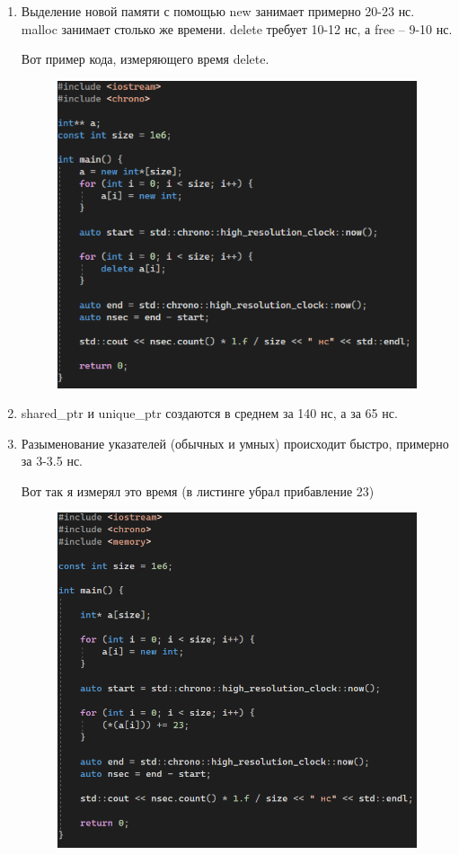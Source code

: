 \documentclass[a4paper,12pt]{article}
\begin{document}
\begin{enumerate}
\item Выделение новой памяти с помощью new занимает примерно 20-23 нс. malloc занимает столько же времени. delete требует 10-12 нс, а free -- 9-10 нс.

Вот пример кода, измеряющего время delete.

\begin{figure}[H]
  \centering
  \includegraphics[width=1\linewidth]{images/asm7_5.png}
\end{figure}

\item shared\_ptr и unique\_ptr создаются в среднем за 140 нс, а  за 65 нс.

\item Разыменование указателей (обычных и умных) происходит быстро, примерно за 3-3.5 нс.

Вот так я измерял это время (в листинге убрал прибавление 23)

\begin{figure}[H]
  \centering
  \includegraphics[width=1\linewidth]{images/asm7_6.png}
\end{figure}


\end{enumerate}
\end{document}
